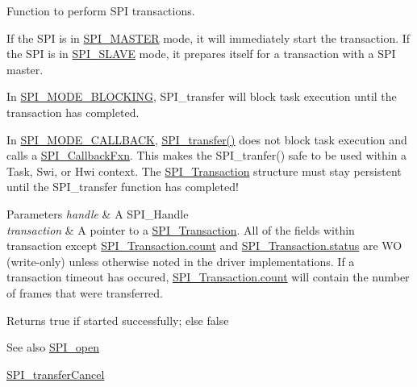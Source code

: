 Function to perform S\+P\+I transactions. 

If the S\+P\+I is in \hyperlink{_s_p_i_8h_a60a7e3d74577b38aa79ea6983362f942a84379dc90398ca075038c8d5ee465f6a}{S\+P\+I\+\_\+\+M\+A\+S\+T\+E\+R} mode, it will immediately start the transaction. If the S\+P\+I is in \hyperlink{_s_p_i_8h_a60a7e3d74577b38aa79ea6983362f942abc98c1546fe12d3fceb1f86cf670faa9}{S\+P\+I\+\_\+\+S\+L\+A\+V\+E} mode, it prepares itself for a transaction with a S\+P\+I master.

In \hyperlink{_s_p_i_8h_ab9ea76c6529d6076eee5e1c4a5a92c6fa0dfb2358e008316426895e7237c398e8}{S\+P\+I\+\_\+\+M\+O\+D\+E\+\_\+\+B\+L\+O\+C\+K\+I\+N\+G}, S\+P\+I\+\_\+transfer will block task execution until the transaction has completed.

In \hyperlink{_s_p_i_8h_ab9ea76c6529d6076eee5e1c4a5a92c6fa5631e69925c47a62a261c78ebbda39fb}{S\+P\+I\+\_\+\+M\+O\+D\+E\+\_\+\+C\+A\+L\+L\+B\+A\+C\+K}, \hyperlink{_s_p_i_8h_a989e17f96b54fcc3dc2cac5f8ac6bdb2}{S\+P\+I\+\_\+transfer()} does not block task execution and calls a \hyperlink{_s_p_i_8h_a207e2d5a7e7ea5606b6995b6485ca015}{S\+P\+I\+\_\+\+Callback\+Fxn}. This makes the S\+P\+I\+\_\+tranfer() safe to be used within a Task, Swi, or Hwi context. The \hyperlink{struct_s_p_i___transaction}{S\+P\+I\+\_\+\+Transaction} structure must stay persistent until the S\+P\+I\+\_\+transfer function has completed!


\begin{DoxyParams}{Parameters}
{\em handle} & A S\+P\+I\+\_\+\+Handle\\
\hline
{\em transaction} & A pointer to a \hyperlink{struct_s_p_i___transaction}{S\+P\+I\+\_\+\+Transaction}. All of the fields within transaction except \hyperlink{struct_s_p_i___transaction_ad049d6a900c4bdb59a5ee8ce3d5bced2}{S\+P\+I\+\_\+\+Transaction.\+count} and \hyperlink{struct_s_p_i___transaction_aa244504b2384411f7de17340be62128a}{S\+P\+I\+\_\+\+Transaction.\+status} are W\+O (write-\/only) unless otherwise noted in the driver implementations. If a transaction timeout has occured, \hyperlink{struct_s_p_i___transaction_ad049d6a900c4bdb59a5ee8ce3d5bced2}{S\+P\+I\+\_\+\+Transaction.\+count} will contain the number of frames that were transferred.\\
\hline
\end{DoxyParams}
\begin{DoxyReturn}{Returns}
true if started successfully; else false
\end{DoxyReturn}
\begin{DoxySeeAlso}{See also}
\hyperlink{_s_p_i_8h_a62cfe494cb1df47cd602e8747e894fd1}{S\+P\+I\+\_\+open} 

\hyperlink{_s_p_i_8h_a6819f7761fc3505c4f885653ff8121f0}{S\+P\+I\+\_\+transfer\+Cancel} 
\end{DoxySeeAlso}
